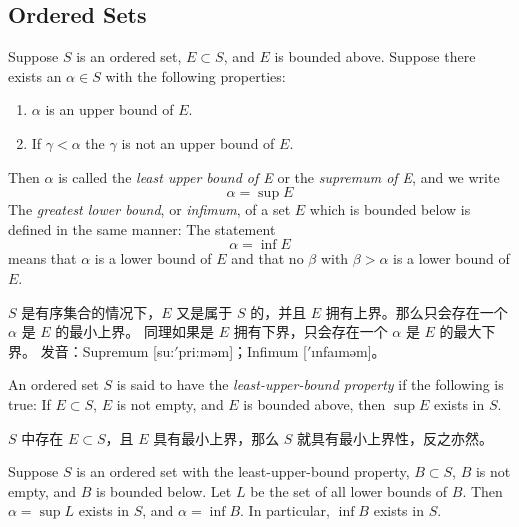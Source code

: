 \documentclass[../poma-notes.tex]{subfiles}
\begin{document}
\subsection*{Ordered Sets}

\setcounter{poma}{6}
\begin{definition}
	Suppose $S$ is an ordered set, $E \subset S$, and $E$ is bounded above.
	Suppose there exists an $\alpha \in S$ with the following properties:
	\begin{enumerate}[label=(\roman*)]
		\item $\alpha$ is an upper bound of $E$.
		\item If $\gamma < \alpha$ the $\gamma$ is not an upper bound of $E$.
	\end{enumerate}

	Then $\alpha$ is called the \textit{least upper bound of E} or the \textit{supremum of E},
	and we write
	\[ \alpha = \sup E \]
	The \textit{greatest lower bound}, or \textit{infimum}, of a set $E$ which is bounded below
	is defined in the same manner: The statement \[ \alpha = \inf E \] means that $\alpha$ is
	a lower bound of $E$ and that no $\beta$ with $\beta > \alpha$ is a lower bound of $E$.
\end{definition}

\anote
$S$ 是有序集合的情况下，$E$ 又是属于 $S$ 的，并且 $E$ 拥有上界。那么只会存在一个 $\alpha$ 是 $E$ 的最小上界。
同理如果是 $E$ 拥有下界，只会存在一个 $\alpha$ 是 $E$ 的最大下界。
发音：Supremum [su:$'$pri:məm]；Infimum [$'$\i nfa\i məm]。

\setcounter{poma}{9}
\begin{definition}
	An ordered set $S$ is said to have the \textit{least-upper-bound property} if the following
	is true: If $E \subset S$, $E$ is not empty, and $E$ is bounded above, then $\sup E$ exists in $S$.
\end{definition}

\anote
$S$ 中存在 $E \subset S$，且 $E$ 具有最小上界，那么 $S$ 就具有最小上界性，反之亦然。

\begin{theorem}
	Suppose $S$ is an ordered set with the least-upper-bound property,
	$B \subset S$, $B$ is not empty, and $B$ is bounded below.
	Let $L$ be the set of all lower bounds of $B$. Then $\alpha = \sup L$
	exists in $S$, and $\alpha = \inf B$.
	In particular, $\inf B$ exists in $S$.
\end{theorem}
\end{document}
